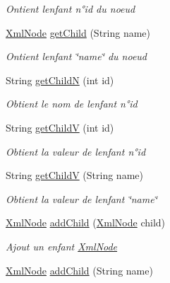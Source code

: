 \begin{DoxyCompactItemize}
\begin{DoxyCompactList}\small\item\em Ontient l\textquotesingle{}enfant n°id du noeud \end{DoxyCompactList}\item 
\mbox{\hyperlink{class_n_t_k_1_1_i_o_1_1_xml_1_1_xml_node}{Xml\+Node}} \mbox{\hyperlink{class_n_t_k_1_1_i_o_1_1_xml_1_1_xml_node_a38197c374ba008fd421414e593a39705}{get\+Child}} (String name)
\begin{DoxyCompactList}\small\item\em Ontient l\textquotesingle{}enfant \char`\"{}name\char`\"{} du noeud \end{DoxyCompactList}\item 
String \mbox{\hyperlink{class_n_t_k_1_1_i_o_1_1_xml_1_1_xml_node_abf82efdcc4a35355bf3506f04f8ea5b0}{get\+ChildN}} (int id)
\begin{DoxyCompactList}\small\item\em Obtient le nom de l\textquotesingle{}enfant n°id \end{DoxyCompactList}\item 
String \mbox{\hyperlink{class_n_t_k_1_1_i_o_1_1_xml_1_1_xml_node_ac1467a6640f1f4239fd619c7f1c4aa50}{get\+ChildV}} (int id)
\begin{DoxyCompactList}\small\item\em Obtient la valeur de l\textquotesingle{}enfant n°id \end{DoxyCompactList}\item 
String \mbox{\hyperlink{class_n_t_k_1_1_i_o_1_1_xml_1_1_xml_node_aa9da411128e095d36f5d577fd810392b}{get\+ChildV}} (String name)
\begin{DoxyCompactList}\small\item\em Obtient la valeur de l\textquotesingle{}enfant \char`\"{}name\char`\"{} \end{DoxyCompactList}\item 
\mbox{\hyperlink{class_n_t_k_1_1_i_o_1_1_xml_1_1_xml_node}{Xml\+Node}} \mbox{\hyperlink{class_n_t_k_1_1_i_o_1_1_xml_1_1_xml_node_a36829cc3fa2852dff02b8f56e30b8bd7}{add\+Child}} (\mbox{\hyperlink{class_n_t_k_1_1_i_o_1_1_xml_1_1_xml_node}{Xml\+Node}} child)
\begin{DoxyCompactList}\small\item\em Ajout un enfant \mbox{\hyperlink{class_n_t_k_1_1_i_o_1_1_xml_1_1_xml_node}{Xml\+Node}} \end{DoxyCompactList}\item 
\mbox{\hyperlink{class_n_t_k_1_1_i_o_1_1_xml_1_1_xml_node}{Xml\+Node}} \mbox{\hyperlink{class_n_t_k_1_1_i_o_1_1_xml_1_1_xml_node_aff52f67ea0200d581a1e584bf5406272}{add\+Child}} (String name)

\end{DoxyCompactItemize}
